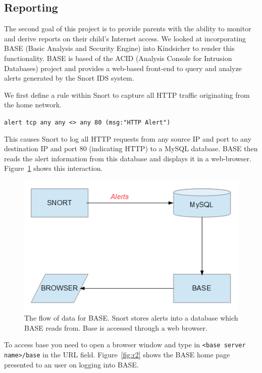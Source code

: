 
\subsection{Reporting}

The second goal of this project is to provide parents with the ability to
monitor and derive reports on their child's Internet access.
%
We looked at incorporating BASE (Basic Analysis and Security Engine) into
Kindsicher to render this functionality.
%
BASE is based of the ACID (Analysis Console for Intrusion Databases) project
and provides a web-based front-end to query and analyze alerts generated by the
Snort IDS system.

We first define a rule within Snort to capture all HTTP traffic originating
from the home network.

\verb+alert tcp any any <> any 80 (msg:"HTTP Alert")+

This causes Snort to log all HTTP requests from any source IP and port to any
destination IP and port 80 (indicating HTTP) to a MySQL database.
%
BASE then reads the alert information from this database and displays it in a
web-browser. Figure~\ref{fig:r1} shows this interaction.

\begin{figure}[!t]
    \centering
    \includegraphics[width=\columnwidth]{figures/R1_BASE_Flow}
    \caption{The flow of data for BASE. Snort stores alerts into a database
    which BASE reads from. Base is accessed through a web browser.}
    \label{fig:r1}
\end{figure}

To access base you need to open a browser window and type in \texttt{<base server
name>/base} in the URL field.
%
Figure~\ref{fig:r2} shows the BASE home page presented to an user on logging
into BASE.

